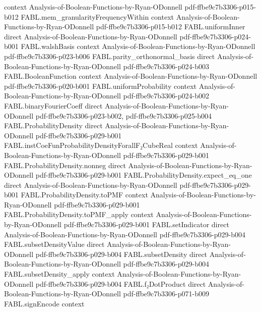 \begin{theorem}
  {context}
  {Analysis-of-Boolean-Functions-by-Ryan-ODonnell}
  {pdf-ffbe9c7b3306-p015-b012}
\proofstep
  {FABL.mem_granularityFrequencyWithin}
  {context}
  {Analysis-of-Boolean-Functions-by-Ryan-ODonnell}
  {pdf-ffbe9c7b3306-p015-b012}
\proofstep
  {FABL.uniformInner}
  {direct}
  {Analysis-of-Boolean-Functions-by-Ryan-ODonnell}
  {pdf-ffbe9c7b3306-p024-b001}
\proofstep
  {FABL.walshBasis}
  {context}
  {Analysis-of-Boolean-Functions-by-Ryan-ODonnell}
  {pdf-ffbe9c7b3306-p023-b006}
\proofstep
  {FABL.parity_orthonormal_basis}
  {direct}
  {Analysis-of-Boolean-Functions-by-Ryan-ODonnell}
  {pdf-ffbe9c7b3306-p024-b003}
\proofstep
  {FABL.BooleanFunction}
  {context}
  {Analysis-of-Boolean-Functions-by-Ryan-ODonnell}
  {pdf-ffbe9c7b3306-p020-b001}
\proofstep
  {FABL.uniformProbability}
  {context}
  {Analysis-of-Boolean-Functions-by-Ryan-ODonnell}
  {pdf-ffbe9c7b3306-p024-b002}
\proofstep
  {FABL.binaryFourierCoeff}
  {direct}
  {Analysis-of-Boolean-Functions-by-Ryan-ODonnell}
  {pdf-ffbe9c7b3306-p023-b002,
    pdf-ffbe9c7b3306-p025-b004}
\proofstep
  {FABL.ProbabilityDensity}
  {direct}
  {Analysis-of-Boolean-Functions-by-Ryan-ODonnell}
  {pdf-ffbe9c7b3306-p029-b001}
\proofstep
  {FABL.instCoeFunProbabilityDensityForallF₂CubeReal}
  {context}
  {Analysis-of-Boolean-Functions-by-Ryan-ODonnell}
  {pdf-ffbe9c7b3306-p029-b001}
\proofstep
  {FABL.ProbabilityDensity.nonneg}
  {direct}
  {Analysis-of-Boolean-Functions-by-Ryan-ODonnell}
  {pdf-ffbe9c7b3306-p029-b001}
\proofstep
  {FABL.ProbabilityDensity.expect_eq_one}
  {direct}
  {Analysis-of-Boolean-Functions-by-Ryan-ODonnell}
  {pdf-ffbe9c7b3306-p029-b001}
\proofstep
  {FABL.ProbabilityDensity.toPMF}
  {context}
  {Analysis-of-Boolean-Functions-by-Ryan-ODonnell}
  {pdf-ffbe9c7b3306-p029-b001}
\proofstep
  {FABL.ProbabilityDensity.toPMF_apply}
  {context}
  {Analysis-of-Boolean-Functions-by-Ryan-ODonnell}
  {pdf-ffbe9c7b3306-p029-b001}
\proofstep
  {FABL.setIndicator}
  {direct}
  {Analysis-of-Boolean-Functions-by-Ryan-ODonnell}
  {pdf-ffbe9c7b3306-p029-b004}
\proofstep
  {FABL.subsetDensityValue}
  {direct}
  {Analysis-of-Boolean-Functions-by-Ryan-ODonnell}
  {pdf-ffbe9c7b3306-p029-b004}
\proofstep
  {FABL.subsetDensity}
  {direct}
  {Analysis-of-Boolean-Functions-by-Ryan-ODonnell}
  {pdf-ffbe9c7b3306-p029-b004}
\proofstep
  {FABL.subsetDensity_apply}
  {context}
  {Analysis-of-Boolean-Functions-by-Ryan-ODonnell}
  {pdf-ffbe9c7b3306-p029-b004}
\proofstep
  {FABL.f₂DotProduct}
  {direct}
  {Analysis-of-Boolean-Functions-by-Ryan-ODonnell}
  {pdf-ffbe9c7b3306-p071-b009}
\proofstep
  {FABL.signEncode}
  {context}

\end{theorem}
